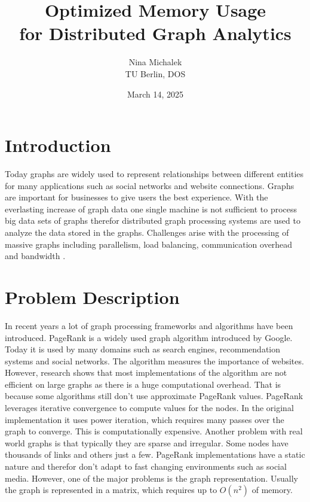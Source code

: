 \documentclass[a4paper,12pt]{article}
\title{Optimized Memory Usage\\ for Distributed Graph Analytics}
\author{Nina Michalek\\TU Berlin, DOS}
\date{March 14, 2025}
\begin{document}
\maketitle

\begin{multicols}{2}

\section{Introduction}
Today graphs are widely used to represent relationships between different entities for many applications such as social networks and website connections. Graphs are important for businesses to give users the best experience. With the everlasting increase of graph data one single machine is not sufficient to process big data sets of graphs therefor distributed graph processing systems are used to analyze the data stored in the graphs. Challenges arise with the processing of massive graphs including parallelism, load balancing, communication overhead and bandwidth \cite{meng_survey_2024}. 

\section{Problem Description}
In recent years a lot of graph processing frameworks and algorithms have been introduced. 
PageRank is a widely used graph algorithm introduced by Google. Today it is used by many domains such as search engines, recommendation systems and social networks. The algorithm measures the importance of websites. However, research shows that most implementations of the algorithm are not efficient on large graphs as there is a huge computational overhead. That is because some algorithms still don't use approximate PageRank values. PageRank leverages iterative convergence to compute values for the nodes. In the original implementation it uses power iteration, which requires many passes over the graph to converge. This is computationally expensive. Another problem with real world graphs is that typically they are sparse and irregular. Some nodes have thousands of links and others just a few. PageRank implementations have a static nature and therefor don't adapt to fast changing environments such as social media. However, one of the major problems is the graph representation. Usually the graph is represented in a matrix, which requires up to $O(n^2)$ of memory.



\end{multicols}
\end{document}
